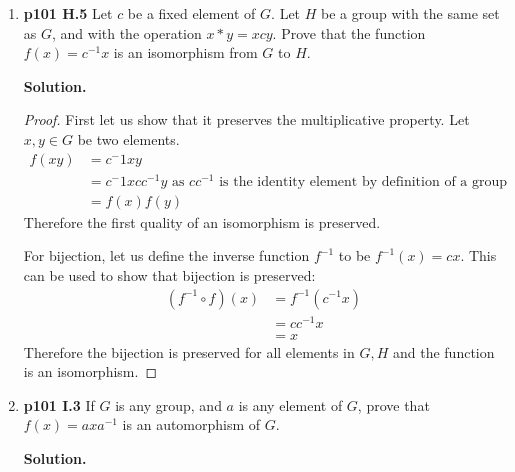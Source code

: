\documentclass[11pt]{article}
\begin{document}
\begin{enumerate}
\begin{proof}
          Therefore both properties of an isomorphism are preserved and the composition is an isomorphism.
	\end{proof}

\item {\bfseries p101 H.5} Let $c$ be a fixed element of $G$. Let $H$ be a group with the same set as $G$, and with the operation $x * y = xcy$. Prove that the function $f(x) = c^{-1}x$ is an isomorphism from $G$ to $H$.
  
	{\bfseries Solution.}
	\begin{proof}
		First let us show that it preserves the multiplicative property. Let $x, y \in G$ be two elements. 
		\begin{align*}
			f(xy) &= c^-1xy \\
			&= c^-1xcc^{-1}y \text{ as $cc^{-1}$ is the identity element by definition of a group} \\
			&= f(x)f(y) 
		\end{align*}
		Therefore the first quality of an isomorphism is preserved.
      
		For bijection, let us define the inverse function $f^{-1}$ to be $f^{-1}(x) = cx$.
		This can be used to show that bijection is preserved:
		\begin{align*}
			(f^{-1} \circ f)(x) &= f^{-1}(c^{-1}x) \\
			&= cc^{-1}x \\
			&= x
		\end{align*}
		Therefore the bijection is preserved for all elements in $G,H$ and the function is an isomorphism.
	\end{proof}

\item {\bfseries p101 I.3} If $G$ is any group, and $a$ is any element of $G$, prove that $f(x) = axa^{-1}$ is an automorphism of $G$.
  
	{\bfseries Solution.}

\end{enumerate}
\end{document}

